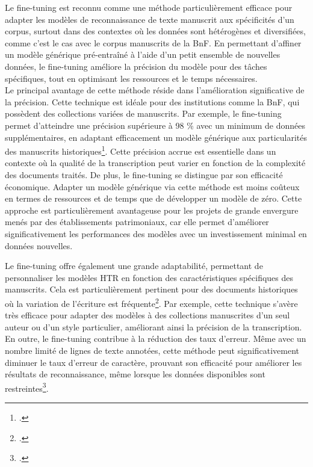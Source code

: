 \documentclass[a4paper,12pt,twoside]{book}
\begin{document}
	Le fine-tuning est reconnu comme une méthode particulièrement efficace pour adapter les modèles de reconnaissance de texte manuscrit aux spécificités d’un corpus, surtout dans des contextes où les données sont hétérogènes et diversifiées, comme c’est le cas avec le corpus manuscrits de la BnF. En permettant d’affiner un modèle générique pré-entraîné à l’aide d’un petit ensemble de nouvelles données, le fine-tuning améliore la précision du modèle pour des tâches spécifiques, tout en optimisant les ressources et le temps nécessaires.
	\\
	
	Le principal avantage de cette méthode réside dans l’amélioration significative de la précision. Cette technique est idéale pour des institutions comme la BnF, qui possèdent des collections variées de manuscrits. Par exemple, le fine-tuning permet d’atteindre une précision supérieure à 98 \% avec un minimum de données supplémentaires, en adaptant efficacement un modèle générique aux particularités des manuscrits historiques\footcite{pinche_htr_2022}. Cette précision accrue est essentielle dans un contexte où la qualité de la transcription peut varier en fonction de la complexité des documents traités. De plus, le fine-tuning se distingue par son efficacité économique. Adapter un modèle générique via cette méthode est moins coûteux en termes de ressources et de temps que de développer un modèle de zéro. Cette approche est particulièrement avantageuse pour les projets de grande envergure menés par des établissements patrimoniaux, car elle permet d’améliorer significativement les performances des modèles avec un investissement minimal en données nouvelles.
	
	Le fine-tuning offre également une grande adaptabilité, permettant de personnaliser les modèles HTR en fonction des caractéristiques spécifiques des manuscrits. Cela est particulièrement pertinent pour des documents historiques où la variation de l’écriture est fréquente\footcite{pippi_how_2023}. Par exemple, cette technique s’avère très efficace pour adapter des modèles à des collections manuscrites d’un seul auteur ou d’un style particulier, améliorant ainsi la précision de la transcription.
	\\
	
	En outre, le fine-tuning contribue à la réduction des taux d’erreur. Même avec un nombre limité de lignes de texte annotées, cette méthode peut significativement diminuer le taux d’erreur de caractère, prouvant son efficacité pour améliorer les résultats de reconnaissance, même lorsque les données disponibles sont restreintes\footcite{kohut_finetuning_2023}.
	\\
	
\end{document}
